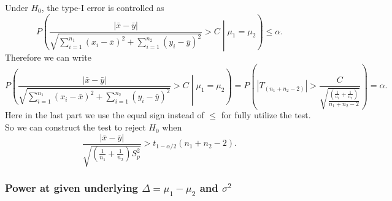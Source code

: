 \documentclass[a4paper,12pt]{article}
\begin{document}
Under $H_0$, the type-I error is controlled as
\[
  P\left(
        \frac{\left|\bar{x} - \bar{y}\right|}{
      \sqrt{
               \sum\limits_{i = 1}^{n_1}\left(x_i - \bar{x}\right)^2
       + \sum\limits_{i = 1}^{n_2}\left(y_i - \bar{y}\right)^2 
      }
    }
    > C
    \middle| \mu_1 = \mu_2
  \right)
  \leq \alpha
  .
\]
Therefore we can write
\[
  P\left(
    \frac{\left|\bar{x} - \bar{y}\right|}{
      \sqrt{
        \sum\limits_{i = 1}^{n_1}\left(x_i - \bar{x}\right)^2
        + \sum\limits_{i = 1}^{n_2}\left(y_i - \bar{y}\right)^2 
      }
    }
    > C
    \middle| \mu_1 = \mu_2
  \right)
  = P\left(
    \left|T_{\left(n_1 + n_2 - 2\right)}\right|
    > \frac{C}{
      \sqrt{\frac{
          \left(\frac{1}{n_1} + \frac{1}{n_2}\right)  
        }{
          n_1 + n_2 - 2
        }
      }
    }
  \right)
  = \alpha
  .
\]
Here in the last part we use the equal sign instead of $\leq$ for fully utilize the test. So we can construct the test to reject $H_0$ when
\[
  \frac{
    \left|\bar{x} - \bar{y}\right|
  }{
    \sqrt{
      \left(\frac{1}{n_1} + \frac{1}{n_2}\right)
      S_p^2
    }
  }
  > t_{1 - \alpha / 2}\left(n_1 + n_2 - 2\right)
  .
\]

\subsubsection{Power at given underlying $\Delta = \mu_1 - \mu_2$ and $\sigma^2$}
\label{sec:power-at-given-3}
\end{document}
